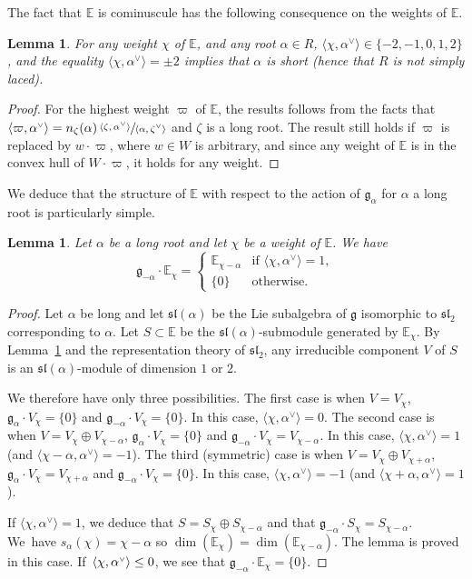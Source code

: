 \documentclass[10pt]{amsart}
\let\oldvee\vee
\renewcommand{\vee}{{\scriptscriptstyle\oldvee}}
\theoremstyle{plain}
\newtheorem{lemm}[theo]{Lemma}
\theoremstyle{definition}
\newcommand{\bE}{\mathbb{E}}
\newcommand{\fgg}{\mathfrak{g}}
\newcommand{\fsl}{\mathfrak{sl}}
\newcommand{\scal}[1]{\langle #1 \rangle}
\begin{document}
The fact that $\bE$ is cominuscule has the following consequence on the weights of $\bE$.

\begin{lemm}
\label{lemm:weight2}
For any weight $\chi$ of $\bE$, and any root $\alpha\in R$, $\scal{\chi,\alpha^\vee}
\in\{-2,-1,0,1,2\}$, and the equality
$\scal{\chi,\alpha^\vee} = \pm 2$ implies that $\alpha$ is short (hence that $R$ is not simply laced).
\end{lemm}

\begin{proof}
For the highest weight $\varpi$ of $\bE$, the results follows from the facts that
$\scal{\varpi,\alpha^\vee}=n_\zeta(\alpha)\,\sfrac{\scal{\zeta,\alpha^\vee}}{\scal{\alpha,\zeta^\vee}}$
and $\zeta$ is a long root. The
result still holds if
$\varpi$ is replaced by $w \cdot \varpi$, where $w \in W$ is arbitrary, and since any weight of
$\bE$ is in the convex hull of $W \cdot \varpi$, it holds for any weight.
\end{proof}

We deduce that the structure of $\bE$ with respect to the action of $\fgg_\alpha$ for $\alpha$ a long
root is particularly simple.

\begin{lemm}
\label{lemm:gV}
Let $\alpha$ be a long root and let $\chi$ be a weight of $\bE$.
We have
$$
\fgg_{-\alpha} \cdot \bE_\chi =
\begin{cases}
\bE_{\chi-\alpha}& \mbox{if } \scal{\chi,\alpha^\vee} = 1, \\
\{ 0 \}& \mbox{otherwise}.
\end{cases}
$$
\end{lemm}
\begin{proof}
Let $\alpha$ be long and let $\fsl(\alpha)$ be the Lie subalgebra of $\fgg$ isomorphic to $\fsl_2$
corresponding to $\alpha$.
Let $S \subset \bE$ be the $\fsl(\alpha)$-submodule generated by $\bE_\chi$. By
Lemma~\ref{lemm:weight2} and the representation theory of $\fsl_2$,
any irreducible component $V$ of $S$ is an $\fsl(\alpha)$-module of dimension $1$ or $2$.

We therefore have
only three possibilities. The first case is when $V=V_\chi$, $\fgg_\alpha \cdot V_\chi = \{0\}$ and
$\fgg_{-\alpha} \cdot V_\chi = \{0\}$. In this case, $\scal{\chi,\alpha^\vee}=0$.
The second case is when $V=V_\chi \oplus V_{\chi - \alpha}$, $\fgg_\alpha \cdot V_\chi = \{0\}$ and
$\fgg_{-\alpha} \cdot V_\chi = V_{\chi-\alpha}$. In this case, $\scal{\chi,\alpha^\vee}=1$ (and
$\scal{\chi-\alpha,\alpha^\vee}=-1$).
The third (symmetric) case is when $V=V_\chi \oplus V_{\chi + \alpha}$, $\fgg_\alpha \cdot V_\chi =
V_{\chi + \alpha}$ and
$\fgg_{-\alpha} \cdot V_\chi = \{0\}$. In this case, $\scal{\chi,\alpha^\vee}=-1$ (and
$\scal{\chi+\alpha,\alpha^\vee}=1$).

If $\scal{\chi,\alpha^\vee} = 1$, we deduce that $S=S_\chi \oplus S_{\chi-\alpha}$ and that
$\fgg_{-\alpha} \cdot S_\chi = S_{\chi-\alpha}$. We~have $s_\alpha(\chi)=\chi-\alpha$ so
$\dim(\bE_\chi) = \dim(\bE_{\chi-\alpha})$. The lemma is proved in this case.
If~$\scal{\chi,\alpha^\vee} \leq\nobreak 0$, we see that $\fgg_{-\alpha} \cdot \bE_\chi = \{0\}$.
\end{proof}
\end{document}
